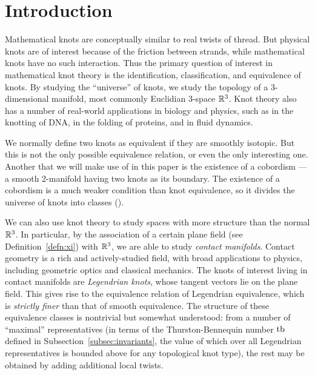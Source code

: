 \chapter{Introduction}\label{ch:intro}

Mathematical knots are conceptually similar to real twists of thread. But physical knots are of interest because of the friction between strands, while mathematical knots have no such interaction.
Thus the primary question of interest in mathematical knot theory is the identification, classification, and equivalence of knots. By studying the ``universe'' of knots, we study the topology of a 3-dimensional manifold, most commonly Euclidian 3-space $\mathbb{R}^3$. 
Knot theory also has a number of real-world applications in biology and physics, such as in the knotting of DNA, in the folding of proteins, and in fluid dynamics.

We normally define two knots as equivalent if they are smoothly isotopic.
But this is not the only possible equivalence relation, or even the only interesting one. Another that we will make use of in this paper is the existence of a cobordism --- a smooth 2-manifold having two knots as its boundary.
The existence of a cobordism is a much weaker condition than knot equivalence, so it divides the universe of knots into classes (\cite{fox-milnor}).

We can also use knot theory to study spaces with more structure than the normal $\mathbb{R}^3$. 
In particular, by the association of a certain plane field (see Definition~\ref{defn:xi}) with $\mathbb{R}^3$, we are able to study \emph{contact manifolds}. Contact geometry is a rich and actively-studied field, with broad applications to physics, including geometric optics and classical mechanics. The knots of interest living in contact manifolds are \emph{Legendrian knots}, whose tangent vectors lie on the plane field.
This gives rise to the equivalence relation of Legendrian equivalence, which is \emph{strictly finer} than that of smooth equivalence.
The structure of these equivalence classes is nontrivial but somewhat understood: from a number of ``maximal'' representatives (in terms of the Thurston-Bennequin number $\operatorname{tb}$ defined in Subsection~\ref{subsec:invariants}, the value of which over all Legendrian representatives is bounded above for any topological knot type), the rest may be obtained by adding additional local twists.

